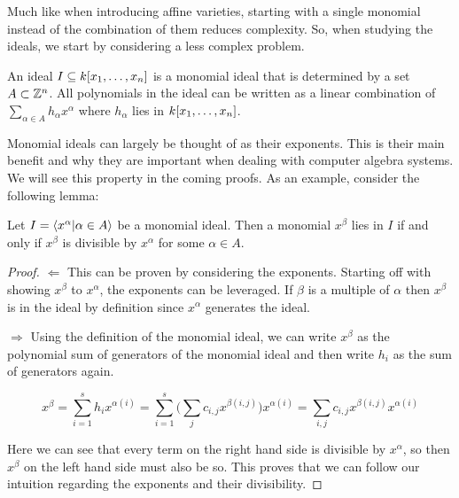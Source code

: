 Much like when introducing affine varieties, starting with a single monomial instead of the combination of them reduces complexity. So, when studying the ideals, we start by considering a less complex problem.

\begin{definition}
    An ideal $I \subseteq k\lbrack x_1, \dots, x_n \rbrack$ is a monomial ideal that is determined by a set $A \subset \mathbb{Z}^n$. All polynomials in the ideal can be written as a linear combination of $\sum_{\alpha \in A} h_\alpha x^\alpha$ where $h_\alpha$ lies in $k\lbrack x_1, \dots, x_n \rbrack$. 
\end{definition}

Monomial ideals can largely be thought of as their exponents. This is their main benefit and why they are important when dealing with computer algebra systems. We will see this property in the coming proofs. As an example, consider the following lemma:

 \begin{lemma} \label{lemma:4-2}
    Let $ I = \langle x^\alpha | \alpha \in A \rangle$ be a monomial ideal. Then a monomial $x^\beta$ lies in $I$ if and only if $x^\beta$ is divisible by $x^\alpha$ for some $\alpha \in A$. 
   \label{lemma:leadTermMembership}
 \end{lemma}

 \begin{proof}
    
   $\Leftarrow$ This can be proven by considering the exponents. Starting off with showing $x^\beta$ to $x^\alpha$, the exponents can be leveraged. If $\beta$ is a multiple of $\alpha$ then $x^\beta$ is in the ideal by definition since $x^\alpha$ generates the ideal. 

   $\Rightarrow$  Using the definition of the monomial ideal, we can write $x^\beta$ as the polynomial sum of generators of the monomial ideal and then write $h_i$ as the sum of generators again.
     
 \[
    x^\beta = \sum_{i = 1}^{s} h_i x^{\alpha(i)} = \sum_{i = 1}^{s}\bigg(\sum_{j}c_{i,j}x^{\beta (i,j)}\bigg)x^{\alpha(i)} = \sum_{i,j} c_{i,j}x^{\beta (i,j)}x^{\alpha(i)}
 \]

 Here we can see that every term on the right hand side is divisible by $x^\alpha$, so then $x^\beta$ on the left hand side must also be so. This proves that we can follow our intuition regarding the exponents and their divisibility.

 \end{proof}

